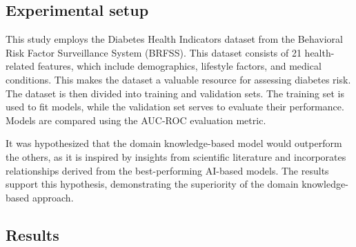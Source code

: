 \documentclass[letterpaper]{article}
\begin{document}
\subsection{Experimental setup}

This study employs the Diabetes Health Indicators dataset from the Behavioral Risk Factor Surveillance System (BRFSS). This dataset consists of 21 health-related features, which include demographics, lifestyle factors, and medical conditions. This makes the dataset a valuable resource for assessing diabetes risk. The dataset is then divided into training and validation sets. The training set is used to fit models, while the validation set serves to evaluate their performance. Models are compared using the AUC-ROC evaluation metric.



It was hypothesized that the domain knowledge-based model would outperform the others, as it is inspired by insights from scientific literature and incorporates relationships derived from the best-performing AI-based models. The results support this hypothesis, demonstrating the superiority of the domain knowledge-based approach. 

\subsection{Results}
\end{document}
